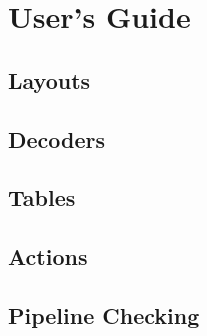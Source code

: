 \chapter{User's Guide} \label{users_guide}

\section{Layouts} \label{layout_guide}

\section{Decoders} \label{decoder_guide}

\section{Tables} \label{table_guide}

\section{Actions} \label{actions_guide}

\section{Pipeline Checking} \label{pipeline)checking_guide}